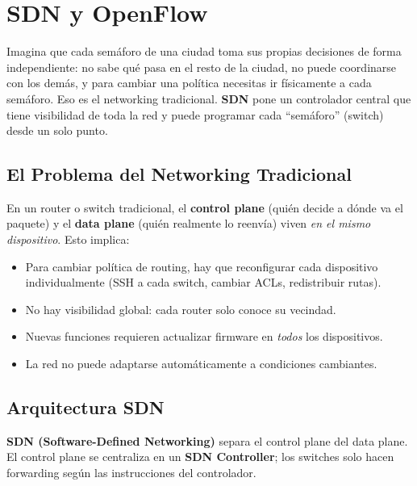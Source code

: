 
\chapter{ SDN y OpenFlow}

Imagina que cada semáforo de una ciudad toma sus propias decisiones de forma independiente:
no sabe qué pasa en el resto de la ciudad, no puede coordinarse con los demás, y para
cambiar una política necesitas ir físicamente a cada semáforo. Eso es el networking
tradicional. \textbf{SDN} pone un controlador central que tiene visibilidad de toda la
red y puede programar cada ``semáforo'' (switch) desde un solo punto.

\section{ El Problema del Networking Tradicional}

\begin{concepto}
En un router o switch tradicional, el \textbf{control plane} (quién decide a dónde va
el paquete) y el \textbf{data plane} (quién realmente lo reenvía) viven \emph{en el
mismo dispositivo}. Esto implica:

\begin{itemize}
    \item Para cambiar política de routing, hay que reconfigurar cada dispositivo
          individualmente (SSH a cada switch, cambiar ACLs, redistribuir rutas).
    \item No hay visibilidad global: cada router solo conoce su vecindad.
    \item Nuevas funciones requieren actualizar firmware en \emph{todos} los dispositivos.
    \item La red no puede adaptarse automáticamente a condiciones cambiantes.
\end{itemize}
\end{concepto}

\section{ Arquitectura SDN}

\begin{concepto}
\textbf{SDN (Software-Defined Networking)} separa el control plane del data plane.
El control plane se centraliza en un \textbf{SDN Controller}; los switches solo hacen
forwarding según las instrucciones del controlador.
\end{concepto}


